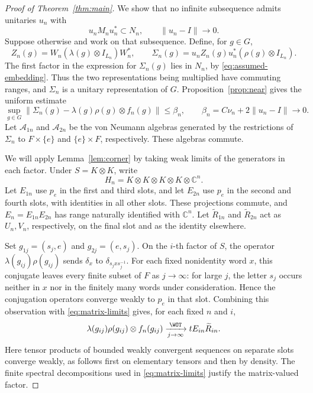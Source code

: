 \begin{proof}[Proof of Theorem~\ref{thm:main}]
We show that no infinite subsequence admits unitaries $u_n$ with
\begin{equation}\label{eq:assumed-embedding}
 u_nM_nu_n^*\subset N_n,\qquad\|u_n-I\|\longrightarrow0.
\end{equation}
Suppose otherwise and work on that subsequence. Define, for $g\in G$,
\[
 Z_n(g)=W_n(\lambda(g)\otimes I_{L_n})W_n^*,\qquad
 \Sigma_n(g)=u_nZ_n(g)u_n^*(\rho(g)\otimes I_{L_n}).
\]
The first factor in the expression for $\Sigma_n(g)$ lies in $N_n$,
by \eqref{eq:assumed-embedding}. Thus the two representations being
multiplied have commuting ranges, and $\Sigma_n$ is a unitary
representation of $G$. Proposition~\ref{prop:near} gives the uniform
estimate
\begin{equation}\label{eq:sigma-bound}
 \sup_{g\in G}
 \bigl\|\Sigma_n(g)-\lambda(g)\rho(g)\otimes f_n(g)\bigr\|
 \leq\beta_n,
 \qquad \beta_n=C\nu_n+2\|u_n-I\|\longrightarrow0.
\end{equation}
Let $\mathcal A_{1n}$ and $\mathcal A_{2n}$ be the von Neumann
algebras generated by the restrictions of $\Sigma_n$ to $F\times\{e\}$
and $\{e\}\times F$, respectively. These algebras commute.

We will apply Lemma~\ref{lem:corner} by taking weak limits of the
generators in each factor. Under $S=K\otimes K$, write
\[
 H_n=K\otimes K\otimes K\otimes K\otimes\mathbb C^n.
\]
Let $E_{1n}$ use $p_e$ in the first and third slots, and let $E_{2n}$
use $p_e$ in the second and fourth slots, with identities in all
other slots. These projections commute, and
$E_n=E_{1n}E_{2n}$ has range naturally identified with $\mathbb C^n$.
Let $\widetilde R_{1n}$ and $\widetilde R_{2n}$ act as $U_n,V_n$,
respectively, on the final slot and as the identity elsewhere.

Set $g_{1j}=(s_j,e)$ and $g_{2j}=(e,s_j)$. On the $i$-th factor
of $S$, the operator $\lambda(g_{ij})\rho(g_{ij})$ sends
$\delta_x$ to $\delta_{s_jxs_j^{-1}}$. For each fixed nonidentity
word $x$, this conjugate leaves every finite subset of $F$ as
$j\to\infty$: for large $j$, the letter $s_j$ occurs neither in
$x$ nor in the finitely many words under consideration. Hence the
conjugation operators converge weakly to $p_e$ in that slot.
Combining this observation with \eqref{eq:matrix-limits} gives,
for each fixed $n$ and $i$,
\begin{equation}\label{eq:joint-limit}
 \lambda(g_{ij})\rho(g_{ij})\otimes f_n(g_{ij})
 \xrightarrow[j\to\infty]{\WOT}tE_{in}\widetilde R_{in}.
\end{equation}
Here tensor products of bounded weakly convergent sequences on
separate slots converge weakly, as follows first on elementary
tensors and then by density. The finite spectral decompositions
used in \eqref{eq:matrix-limits} justify the matrix-valued factor.


\end{proof}

